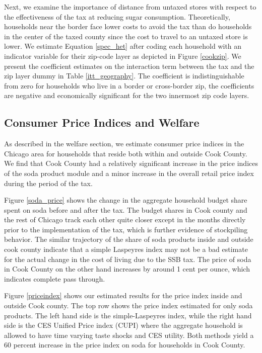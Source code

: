 \documentclass[12pt]{article}
\begin{document}
Next, we examine the importance of distance from untaxed stores with respect to the effectiveness of the tax at reducing sugar consumption. Theoretically, households near the border face lower costs to avoid the tax than do households in the center of the taxed county since the cost to travel to an untaxed store is lower. We estimate Equation \ref{spec_het} after coding each household with an indicator variable for their zip-code layer as depicted in Figure \ref{cookzip}. We present the coefficient estimates on the interaction term between the tax and the zip layer dummy in Table \ref{itt_geography}. The coefficient is indistinguishable from zero for households who live in a border or cross-border zip, the coefficients are negative and economically significant for the two innermost zip code layers.

\subsection{Consumer Price Indices and Welfare}

As described in the welfare section, we estimate consumer price indices in the Chicago area for households that reside both within and outside Cook County. We find that Cook County had a relatively significant increase in the price indices of the soda product module and a minor increase in the overall retail price index during the period of the tax.

Figure \ref{soda_price} shows the change in the aggregate household budget  share spent on soda before and after the tax. The budget shares in Cook county and the rest of Chicago track each other quite closer except in the months directly prior to the implementation of the tax, which is further evidence of stockpiling behavior. The similar trajectory of the share of soda products inside and outside cook county indicate that a simple Laspeyres index may not be a bad estimate for the actual change in the cost of living due to the SSB tax. The price of soda in Cook County  on the other hand increases by around 1 cent per ounce, which indicates complete pass through.

Figure \ref{priceindex} shows our estimated results for the price index inside and outside Cook county. The top row shows the price index estimated for only soda products. The left hand side is the simple-Laspeyres index, while the right hand side is the CES Unified Price index (CUPI) where the aggregate household is allowed to have time varying taste shocks and CES utility. Both methods yield a 60 percent increase in the price index on soda for households in Cook County.
\end{document}
